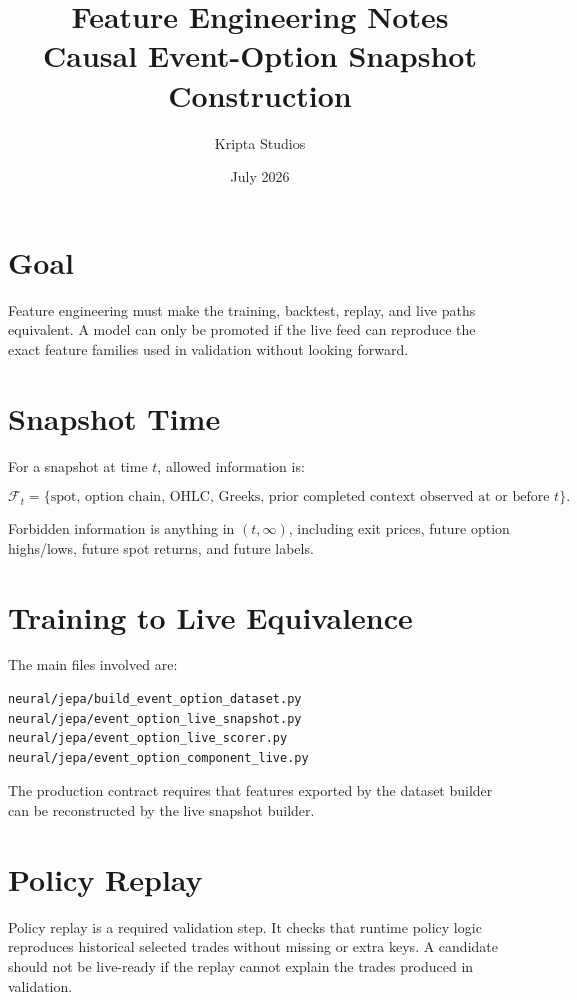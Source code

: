 \documentclass[11pt,a4paper]{article}
\title{\textbf{Feature Engineering Notes}\\Causal Event-Option Snapshot Construction}
\author{Kripta Studios}
\date{July 2026}
\begin{document}
\maketitle
\tableofcontents
\newpage

\section{Goal}

Feature engineering must make the training, backtest, replay, and live paths equivalent. A model can only be promoted if the live feed can reproduce the exact feature families used in validation without looking forward.

\section{Snapshot Time}

For a snapshot at time $t$, allowed information is:

\[
\mathcal{F}_t = \{\text{spot, option chain, OHLC, Greeks, prior completed context observed at or before } t\}.
\]

Forbidden information is anything in $(t,\infty)$, including exit prices, future option highs/lows, future spot returns, and future labels.

\section{Training to Live Equivalence}

The main files involved are:

\begin{lstlisting}
neural/jepa/build_event_option_dataset.py
neural/jepa/event_option_live_snapshot.py
neural/jepa/event_option_live_scorer.py
neural/jepa/event_option_component_live.py
\end{lstlisting}

The production contract requires that features exported by the dataset builder can be reconstructed by the live snapshot builder.

\section{Policy Replay}

Policy replay is a required validation step. It checks that runtime policy logic reproduces historical selected trades without missing or extra keys. A candidate should not be live-ready if the replay cannot explain the trades produced in validation.
\end{document}
